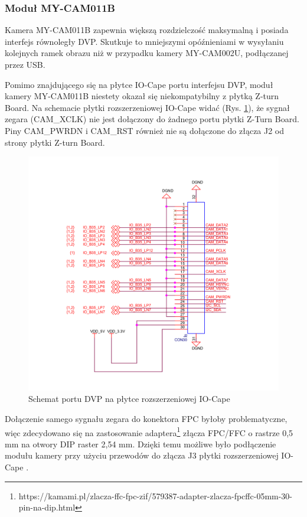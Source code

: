 \subsubsection{Moduł MY-CAM011B}

Kamera MY-CAM011B zapewnia większą rozdzielczość maksymalną i posiada interfejs równoległy DVP. Skutkuje to mniejszymi 
opóźnieniami w wysyłaniu kolejnych ramek obrazu niż w przypadku kamery MY-CAM002U, podłączanej przez USB. 

Pomimo znajdującego się na płytce IO-Cape portu interfejsu DVP, moduł kamery MY-CAM011B niestety okazał się niekompatybilny z 
płytką Z-turn Board. Na schemacie płytki rozszerzeniowej IO-Cape widać (Rys. \ref{cam-schematic}), że sygnał zegara 
(CAM\_XCLK) nie jest dołączony do żadnego portu płytki Z-Turn Board. Piny CAM\_PWRDN i CAM\_RST również nie są dołączone do 
złącza J2 od strony płytki Z-turn Board. 

\begin{figure}[!h]
  \centering
  \includegraphics[width=\textwidth]{img/cam-schematic.png}
  \caption{Schemat portu DVP na płytce rozszerzeniowej IO-Cape}
  \label{cam-schematic}
\end{figure}

Dołączenie samego sygnału zegara do konektora FPC byłoby problematyczne, więc zdecydowano się na zastosowanie 
adaptera\footnote{https://kamami.pl/zlacza-ffc-fpc-zif/579387-adapter-zlacza-fpcffc-05mm-30-pin-na-dip.html} złącza FPC/FFC o 
rastrze 0,5 mm na otwory DIP raster 2,54 mm. Dzięki temu możliwe było podłączenie modułu kamery przy użyciu przewodów do 
złącza J3 płytki rozszerzeniowej IO-Cape \cite{ZturnIOCapeSchematic}.


